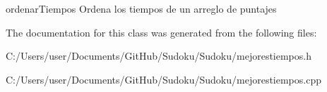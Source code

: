 ordenar\-Tiempos Ordena los tiempos de un arreglo de puntajes 

The documentation for this class was generated from the following files\-:\begin{DoxyCompactItemize}
\item 
C\-:/\-Users/user/\-Documents/\-Git\-Hub/\-Sudoku/\-Sudoku/mejorestiempos.\-h\item 
C\-:/\-Users/user/\-Documents/\-Git\-Hub/\-Sudoku/\-Sudoku/mejorestiempos.\-cpp\end{DoxyCompactItemize}
